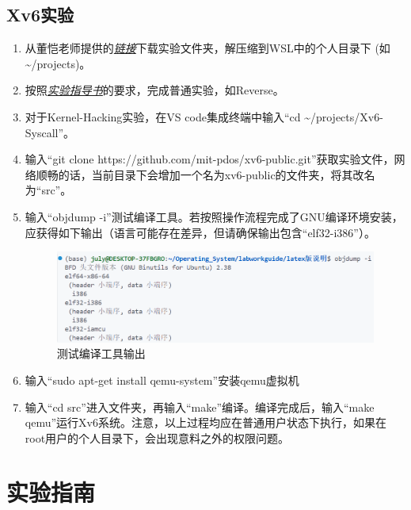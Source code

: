 \documentclass[fontset=ubuntu]{ctexart}
\let\oldhref\href{}
\renewcommand{\href}[2]{\oldhref{#1}{\textit{#2}}}
\begin{document}
\subsection{Xv6实验}

\begin{enumerate}
    \item 从董恺老师提供的\href{https://seunic-my.sharepoint.cn/:u:/g/personal/101011912_seu_edu_cn/EUWd54wqsdJNu_h-sHQ1X2YBiZ24oi4rryRwXdoFGWpGsw?e=vDNOXc}{链接}下载实验文件夹，解压缩到WSL中的个人目录下 (如\~{}/projects)。
    \item 按照\href{https://www.overleaf.com/project/604ac6e691e6cf4d8ba0b24a}{实验指导书}的要求，完成普通实验，如Reverse。
    \item 对于Kernel-Hacking实验，在VS code集成终端中输入“cd \~{}/projects/Xv6-Syscall”。
    \item 输入“git clone https://github.com/mit-pdos/xv6-public.git”获取实验文件，网络顺畅的话，当前目录下会增加一个名为xv6-public的文件夹，将其改名为“src”。
    \item 输入“objdump -i”测试编译工具。若按照操作流程完成了GNU编译环境安装，应获得如下输出（语言可能存在差异，但请确保输出包含“elf32-i386”）。
          \begin{figure}[htbp]
              \centering
              \includegraphics[width=\textwidth]{./README.assets/objdump.png}
              \caption{测试编译工具输出}
          \end{figure}
    \item 输入“sudo apt-get install qemu-system”安装qemu虚拟机
    \item 输入“cd src”进入文件夹，再输入“make”编译。编译完成后，输入“make qemu”运行Xv6系统。注意，以上过程均应在普通用户状态下执行，如果在root用户的个人目录下，会出现意料之外的权限问题。
\end{enumerate}

\newpage{}

\section{实验指南}
\end{document}
